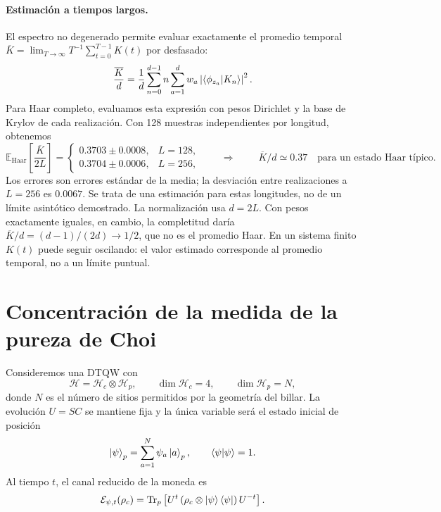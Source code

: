 \paragraph{Estimación a tiempos largos.}
El espectro no degenerado permite evaluar exactamente el promedio temporal
$\overline K=\lim_{T\to\infty}T^{-1}\sum_{t=0}^{T-1}K(t)$ por desfasado:
\begin{equation}
 \frac{\overline K}{d}
 =\frac{1}{d}\sum_{n=0}^{d-1}n\sum_{a=1}^{d}
 w_a\left|\braket{\phi_{z_a}}{K_n}\right|^2.
 \label{eq:hadamard-line-long-time}
\end{equation}
Para Haar completo, evaluamos esta expresión con pesos Dirichlet y la
base de Krylov de cada realización. Con 128 muestras independientes por
longitud, obtenemos
\begin{equation}
 \mathbb E_{\mathrm{Haar}}\!\left[\frac{\overline K}{2L}\right]
 =\begin{cases}
 0.3703\pm0.0008,&L=128,\\
 0.3704\pm0.0006,&L=256,
 \end{cases}
 \qquad\Longrightarrow\qquad
 \boxed{\;\overline K/d\simeq0.37\quad\text{para un estado Haar típico}.\;}
 \label{eq:hadamard-line-plateau-estimate}
\end{equation}
Los errores son errores estándar de la media; la desviación entre
realizaciones a $L=256$ es $0.0067$. Se trata de una estimación para estas
longitudes, no de un límite asintótico demostrado. La normalización usa
$d=2L$. Con pesos exactamente iguales, en cambio, la completitud daría
$\overline K/d=(d-1)/(2d)\to1/2$, que no es el promedio Haar.
En un sistema finito $K(t)$ puede seguir oscilando: el valor estimado
corresponde al promedio temporal, no a un límite puntual.




\clearpage
\appendix
\section{Concentración de la medida de la pureza de Choi} %

Consideremos una DTQW con
\begin{equation}
    \mathcal H=\mathcal H_c\otimes\mathcal H_p,
    \qquad
    \dim\mathcal H_c=4,
    \qquad
    \dim\mathcal H_p=N,
\end{equation}
donde $N$ es el número de sitios permitidos por la geometría del billar.
La evolución $U=SC$ se mantiene fija y la única variable será el estado
inicial de posición
\begin{equation}
    \ket{\psi}_p=\sum_{a=1}^{N}\psi_a\ket{a}_p,
    \qquad
    \braket{\psi}{\psi}=1.
\end{equation}
Al tiempo $t$, el canal reducido de la moneda es
\begin{equation}
    \mathcal E_{\psi,t}(\rho_c)
    =
    \operatorname{Tr}_p\left[
        U^t\left(\rho_c\otimes\ket{\psi}\bra{\psi}\right)U^{-t}
    \right].
\end{equation}

